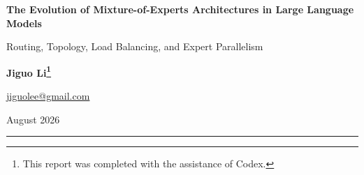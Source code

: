 \documentclass[10pt,a4paper,fontset=none]{ctexart}
\begin{document}
\begin{center}
  {\bfseries\color{DeepBlue}
The Evolution of Mixture-of-Experts Architectures in Large Language Models}\par
  \vspace{4pt}
{\color{DeepBlue} Routing, Topology, Load Balancing, and Expert Parallelism}\par
  \vspace{10pt}
{\normalsize\textbf{Jiguo Li\footnote{This report was completed with the assistance of Codex.}}}\par
  \vspace{2pt}
  {\small\href{mailto:jiguolee@gmail.com}{jiguolee@gmail.com}}\par
  \vspace{6pt}
{\small August 2026}\par
\end{center}
\vspace{5pt}
\hrule

\begin{abstract}
Mixture-of-Experts models increase parameter capacity while keeping the computation activated by each token bounded, but their architectural evolution cannot be explained by a chronological list of model releases alone. This technical survey synthesizes primary papers, official technical reports, and prior surveys to organize modern Mixture-of-Experts systems along five coupled dimensions: expert granularity, expert topology, routing freedom, the scope of load balancing, and execution structure. We describe eight architectural milestones as a dependency graph with six mainline developments and two orthogonal branches, rather than as eight successive generations. We then analyze individual systems through four control planes: Expert Topology, Routing, Balance, and Expert Parallelism. These planes specify which experts exist, which experts process each token, how aggregate load is controlled, and how selected computation is mapped onto physical devices. The framework connects algorithmic choices such as Top-k routing, shared experts, fine-grained experts, and dynamic expert composition with systems concerns including token dispatch, device placement, all-to-all communication, and communication-computation overlap. We conclude with equal-budget pretraining experiments, quality and systems metrics, and open research questions. The main trend is a shift from merely activating more sparse parameters toward decoupling semantic routing, computational budgets, and physical execution.
\end{abstract}
\end{document}
